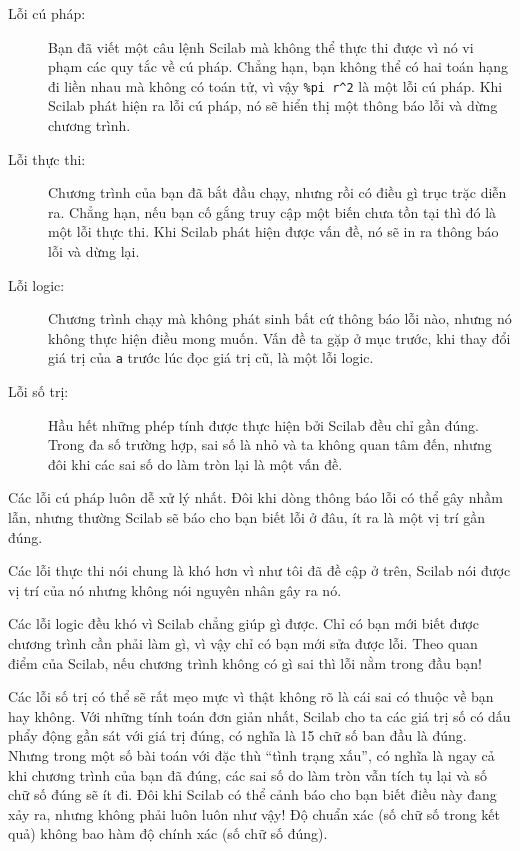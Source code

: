 \documentclass[12pt]{book}
\begin{document}
\begin{description}

\item[Lỗi cú pháp:] Bạn đã viết một câu lệnh Scilab mà không thể
thực thi được vì nó vi phạm các quy tắc về cú pháp. Chẳng hạn, bạn
không thể có hai toán hạng đi liền nhau mà không có toán tử, vì vậy
\verb+%pi r^2+ là một lỗi cú pháp. Khi Scilab phát hiện ra lỗi cú pháp,
nó sẽ hiển thị một thông báo lỗi và dừng chương trình.

\item[Lỗi thực thi:] Chương trình của bạn đã bắt đầu chạy, nhưng rồi
có điều gì trục trặc diễn ra. Chẳng hạn, nếu bạn cố gắng truy cập
một biến chưa tồn tại thì đó là một lỗi thực thi. Khi Scilab phát hiện
được vấn đề, nó sẽ in ra thông báo lỗi và dừng lại.

\item[Lỗi logic:] Chương trình chạy mà không phát sinh bất cứ thông báo
lỗi nào, nhưng nó không thực hiện điều mong muốn. Vấn đề ta gặp ở
mục trước, khi thay đổi giá trị của {\tt a} trước lúc đọc giá trị cũ, là
một lỗi logic.

\item[Lỗi số trị:] Hầu hết những phép tính được thực hiện bởi Scilab 
đều chỉ gần đúng. Trong đa số trường hợp, sai số là nhỏ và ta không
quan tâm đến, nhưng đôi khi các sai số do làm tròn lại là một vấn đề.

\end{description}

Các lỗi cú pháp luôn dễ xử lý nhất. Đôi khi dòng thông báo lỗi có thể
gây nhầm lẫn, nhưng thường Scilab sẽ báo cho bạn biết lỗi ở đâu,
ít ra là một vị trí gần đúng.

Các lỗi thực thi nói chung là khó hơn vì như tôi đã đề cập ở trên, 
Scilab nói được vị trí của nó nhưng không nói nguyên nhân gây ra nó.

Các lỗi logic đều khó vì Scilab chẳng giúp gì được. Chỉ có bạn mới
biết được chương trình cần phải làm gì, vì vậy chỉ có bạn mới sửa được
lỗi. Theo quan điểm của Scilab, nếu chương trình không có gì sai
thì lỗi nằm trong đầu bạn!

Các lỗi số trị có thể sẽ rất mẹo mực vì thật không rõ là cái sai có
thuộc về bạn hay không. Với những tính toán đơn giản nhất, 
Scilab cho ta các giá trị số có dấu phẩy động gần sát với giá
trị đúng, có nghĩa là 15 chữ số ban đầu là đúng. Nhưng trong một số
bài toán với đặc thù ``tình trạng xấu'', có nghĩa là ngay cả khi 
chương trình của bạn đã đúng, các sai số do làm tròn vẫn tích tụ lại
và số chữ số đúng sẽ ít đi. Đôi khi Scilab có thể cảnh báo cho bạn
biết điều này đang xảy ra, nhưng không phải luôn luôn như vậy! 
Độ chuẩn xác (số chữ số trong kết quả) không bao hàm độ
chính xác (số chữ số đúng).
\end{document}
